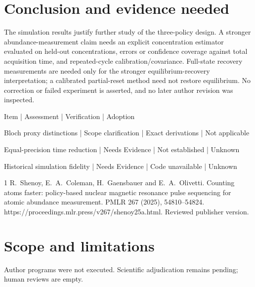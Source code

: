 \documentclass[10pt]{article}
\begin{document}
\section*{Conclusion and evidence needed}
The simulation results justify further study of the three-policy design. A stronger abundance-measurement claim needs an explicit concentration estimator evaluated on held-out concentrations, errors or confidence coverage against total acquisition time, and repeated-cycle calibration/covariance. Full-state recovery measurements are needed only for the stronger equilibrium-recovery interpretation; a calibrated partial-reset method need not restore equilibrium. No correction or failed experiment is asserted, and no later author revision was inspected.\par
Item | Assessment | Verification | Adoption\par
Bloch proxy distinctions | Scope clarification | Exact derivations | Not applicable\par
Equal-precision time reduction | Needs Evidence | Not established | Unknown\par
Historical simulation fidelity | Needs Evidence | Code unavailable | Unknown\par
1 R. Shenoy, E. A. Coleman, H. Gaensbauer and E. A. Olivetti. Counting atoms faster: policy-based nuclear magnetic resonance pulse sequencing for atomic abundance measurement. PMLR 267 (2025), 54810–54824. https://proceedings.mlr.press/v267/shenoy25a.html. Reviewed publisher version.\par
\section*{Scope and limitations}
Author programs were not executed. Scientific adjudication remains pending; human reviews are empty.\par
\end{document}

